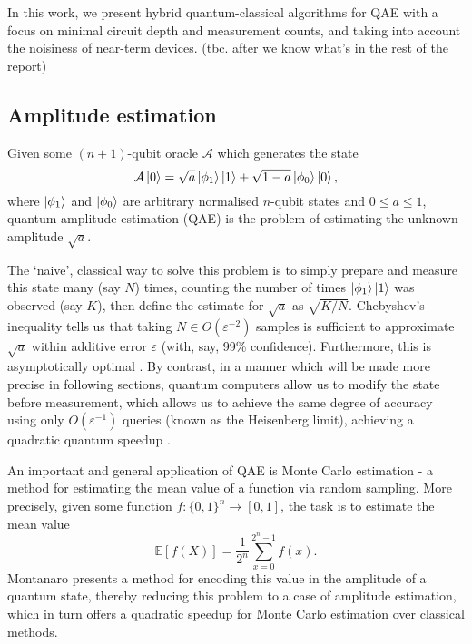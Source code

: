 In this work, we present hybrid quantum-classical algorithms for QAE with a focus on minimal circuit depth and measurement counts, and taking into account the noisiness of near-term devices. {\color{purple} (tbc. after we know what's in the rest of the report)}

\subsection{Amplitude estimation}

\begin{problem}
	Given some $(n+1)$-qubit oracle $\mathcal{A}$ which generates the state
	\[
	\mathcal{A} \ket{0} = \sqrt{a} \ket{\phi_1} \ket{1} + \sqrt{1-a} \ket{\phi_0} \ket{0},
	\]
	where $\ket{\phi_1}$ and $\ket{\phi_0}$ are arbitrary normalised $n$-qubit states and $0 \leq a \leq  1$, quantum amplitude estimation (QAE) is the problem of estimating the unknown amplitude $\sqrt{a}$.
\end{problem}

The `naive', classical way to solve this problem is to simply prepare and measure this state many (say $N$) times, counting the number of times $\ket{\phi_1}\ket{1}$ was observed (say $K$), then define the estimate for $\sqrt{a}$ as $\sqrt{K/N}$. Chebyshev's inequality tells us that taking $N \in O(\varepsilon^{-2})$ samples is sufficient to approximate $\sqrt{a}$ within additive error $\varepsilon$ (with, say, 99\% confidence). Furthermore, this is asymptotically optimal \cite{dagum_2000_opt_alg_for_MC_est}. By contrast, in a manner which will be made more precise in following sections, quantum computers allow us to modify the state before measurement, which allows us to achieve the same degree of accuracy using only $O(\varepsilon^{-1})$ queries (known as the Heisenberg limit), achieving a quadratic quantum speedup \cite{brassard_2002_q_amp_amp}.

An important and general application of QAE is Monte Carlo estimation \cite{heinrich_2002_q_sum_for_integration, montanaro_2015_q_MC_methods, suzuki_2020_amp_without_phase} - a method for estimating the mean value of a function via random sampling. More precisely, given some function $f : \{0,1\}^n \rightarrow [0,1]$, the task is to estimate the mean value
\[
\mathbb{E}[f(X)] = \frac{1}{2^n} \sum_{x=0}^{2^n-1} {f(x)}.
\]
Montanaro \cite{montanaro_2015_q_MC_methods} presents a method for encoding this value in the amplitude of a quantum state, thereby reducing this problem to a case of amplitude estimation, which in turn offers a quadratic speedup for Monte Carlo estimation over classical methods.

